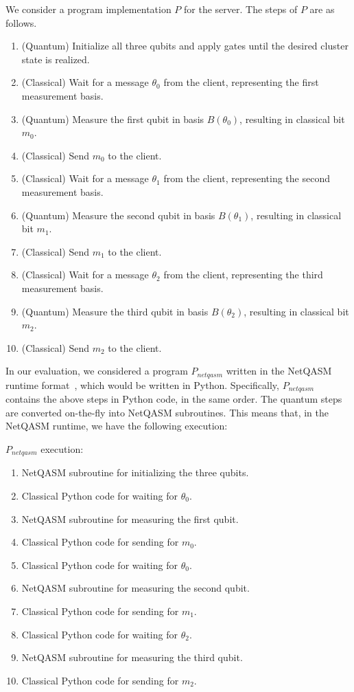 We consider a program implementation $P$ for the server.
The steps of $P$ are as follows.
\begin{enumerate}
  \item (Quantum) Initialize all three qubits and apply gates until the desired cluster state is realized.
  \item (Classical) Wait for a message $\theta_0$ from the client, representing the first measurement basis.
  \item (Quantum) Measure the first qubit in basis $B(\theta_0)$, resulting in classical bit $m_0$.
  \item (Classical) Send $m_0$ to the client.
  \item (Classical) Wait for a message $\theta_1$ from the client, representing the second measurement basis.
  \item (Quantum) Measure the second qubit in basis $B(\theta_1)$, resulting in classical bit $m_1$.
  \item (Classical) Send $m_1$ to the client.
  \item (Classical) Wait for a message $\theta_2$ from the client, representing the third measurement basis.
  \item (Quantum) Measure the third qubit in basis $B(\theta_2)$, resulting in classical bit $m_2$.
  \item (Classical) Send $m_2$ to the client.
\end{enumerate}

In our evaluation, we considered a program $P_{netqasm}$ written in the NetQASM runtime format~\cite{dahlberg2022netqasm}, which would be written in Python.
Specifically, $P_{netqasm}$ contains the above steps in Python code, in the same order.
The quantum steps are converted on-the-fly into NetQASM subroutines.
This means that, in the NetQASM runtime, we have the following execution:

$P_{netqasm}$ execution:
\begin{enumerate}
  \item NetQASM subroutine for initializing the three qubits.
  \item Classical Python code for waiting for $\theta_0$.
  \item NetQASM subroutine for measuring the first qubit.
  \item Classical Python code for sending for $m_0$.
  \item Classical Python code for waiting for $\theta_0$.
  \item NetQASM subroutine for measuring the second qubit.
  \item Classical Python code for sending for $m_1$.
  \item Classical Python code for waiting for $\theta_2$.
  \item NetQASM subroutine for measuring the third qubit.
  \item Classical Python code for sending for $m_2$.
\end{enumerate}

